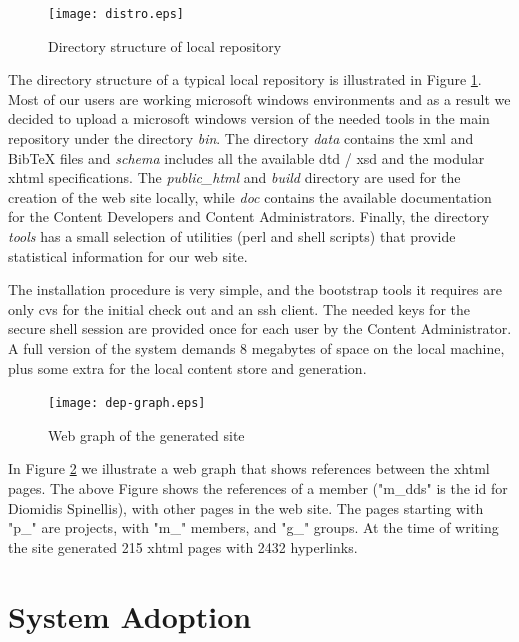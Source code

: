 \documentclass[10pt]{article}
\begin{document}
\begin{figure}
\texttt{[image: distro.eps]}
\caption{Directory structure of local repository}
\label{fig:eltrun-web-distro}
\end{figure}

The directory structure of a typical 
local repository is illustrated in Figure \ref{fig:eltrun-web-distro}.
Most of our users are working {\sc microsoft windows} environments and as 
a result we decided to upload a {\sc microsoft windows} version of the needed tools 
in the main repository under the directory \textit{bin}.
The directory \textit{data} contains the {\sc xml} and {\sc BibTeX} files and \textit{schema}
includes all the available {\sc dtd / xsd} and the modular {\sc xhtml} specifications.
The \textit{public\_html} and \textit{build} directory are used for the creation of the 
web site locally, while \textit{doc} contains the available documentation for the Content Developers
and Content Administrators. Finally, the directory \textit{tools} has a small selection 
of utilities ({\sc perl} and shell scripts) that provide statistical information
for our web site.

The installation procedure is very simple,
and the bootstrap tools it requires are only {\sc cvs} for 
the initial check out and an {\sc ssh} client. The needed keys 
for the secure shell session are provided once for each user by the Content Administrator. 
A full version of the system demands 8 megabytes of space 
on the local machine, plus some extra for the local content store and generation.

\begin{figure}
\texttt{[image: dep-graph.eps]}
\caption{Web graph of the generated site}
\label{fig:eltrun-web-m-dds-snapshot}
\end{figure}

In Figure \ref{fig:eltrun-web-m-dds-snapshot} we illustrate a web graph \cite{KRRSTU00} 
that shows references between the {\sc xhtml} pages.
The above Figure shows the references  of a member ("m\_dds" is the {\sc id} for 
Diomidis Spinellis), with other pages in the web site.
The pages starting with "p\_" are projects, with "m\_" members, and "g\_" groups.
At the time of writing the site generated 215 {\sc xhtml} pages with 2432 hyperlinks. 

\section{System Adoption}
\label{sec:adopt}
\end{document}
